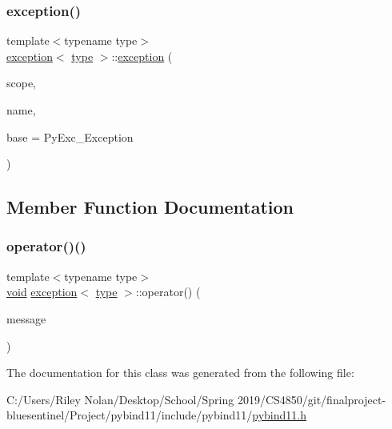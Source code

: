 \subsubsection{\texorpdfstring{exception()}{exception()}\hspace{0.1cm}{\footnotesize\ttfamily [2/2]}}
{\footnotesize\ttfamily template$<$typename type$>$ \\
\mbox{\hyperlink{classexception}{exception}}$<$ \mbox{\hyperlink{_s_d_l__opengl_8h_ad5ddf6fca7b585646515660e810e0188}{type}} $>$\+::\mbox{\hyperlink{classexception}{exception}} (\begin{DoxyParamCaption}\item[{\mbox{\hyperlink{classhandle}{handle}}}]{scope,  }\item[{const char $\ast$}]{name,  }\item[{\mbox{\hyperlink{_python27_2object_8h_aadc84ac7aed2cfa6f20c25f62bf3dac7}{Py\+Object}} $\ast$}]{base = {\ttfamily PyExc\+\_\+Exception} }\end{DoxyParamCaption})\hspace{0.3cm}{\ttfamily [inline]}}



\subsection{Member Function Documentation}
\mbox{\label{classexception_ac9b98aed26c8e302721614222245da93}} 
\subsubsection{\texorpdfstring{operator()()}{operator()()}}
{\footnotesize\ttfamily template$<$typename type$>$ \\
\mbox{\hyperlink{_s_d_l__opengles2__gl2ext_8h_ae5d8fa23ad07c48bb609509eae494c95}{void}} \mbox{\hyperlink{classexception}{exception}}$<$ \mbox{\hyperlink{_s_d_l__opengl_8h_ad5ddf6fca7b585646515660e810e0188}{type}} $>$\+::operator() (\begin{DoxyParamCaption}\item[{const char $\ast$}]{message }\end{DoxyParamCaption})\hspace{0.3cm}{\ttfamily [inline]}}



The documentation for this class was generated from the following file\+:\begin{DoxyCompactItemize}
\item 
C\+:/\+Users/\+Riley Nolan/\+Desktop/\+School/\+Spring 2019/\+C\+S4850/git/finalproject-\/bluesentinel/\+Project/pybind11/include/pybind11/\mbox{\hyperlink{pybind11_8h}{pybind11.\+h}}\end{DoxyCompactItemize}
